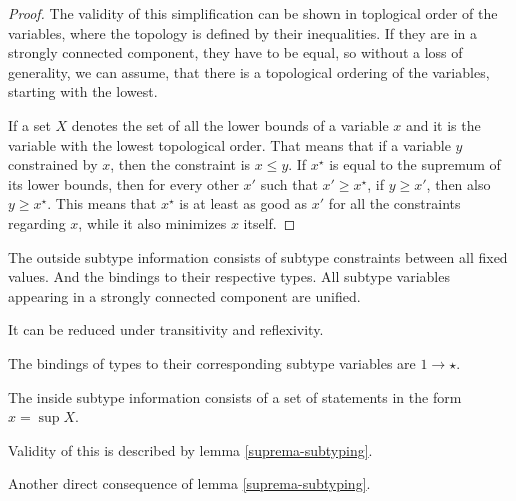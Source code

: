 \begin{lemma}
    \label{suprema-subtyping}
\end{lemma}

\begin{proof}
The validity of this simplification can be shown in toplogical order of the variables, where the topology is defined by their inequalities. If they are in a strongly connected component, they have to be equal, so without a loss of generality, we can assume, that there is a topological ordering of the variables, starting with the lowest.

If a set $X$ denotes the set of all the lower bounds of a variable $x$ and it is the variable with the lowest topological order. That means that if a variable $y$ constrained by $x$, then the constraint is $x \leq y$. If $x^\star$ is equal to the supremum of its lower bounds, then for every other $x'$ such that $x' \geq x^\star$, if $y \geq x'$, then also $y \geq x^\star$. This means that $x^\star$ is at least as good as $x'$ for all the constraints regarding $x$, while it also minimizes $x$ itself.
\end{proof}

\begin{defn}
    The outside subtype information consists of subtype constraints between all fixed values. And the bindings to their respective types. All subtype variables appearing in a strongly connected component are unified. 

    It can be reduced under transitivity and reflexivity.
\end{defn}

\begin{cor}
    The bindings of types to their corresponding subtype variables are $1 \to \star$.
\end{cor}

\begin{defn}
    The inside subtype information consists of a set of statements in the form $x = \sup X$.

    Validity of this is described by lemma \ref{suprema-subtyping}.
\end{defn}

\begin{cor}

    Another direct consequence of lemma \ref{suprema-subtyping}.
\end{cor}

